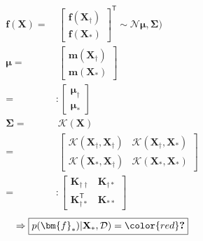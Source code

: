 \begin{align}
    \bm{f}(\mathbf{X})
    =&~ \left[\begin{array}{c}
        \bm{f}(\mathbf{X}_\dagger) \\
        \bm{f}(\mathbf{X}_*)
    \end{array}\right]^\mathsf{T} 
    \sim \mathcal{N}{\bm{\mu},\mathbf{\Sigma})} \\
    \bm{\mu} 
    =&~ \left[\begin{array}{c}
        \bm{m}(\mathbf{X}_\dagger) \\
        \bm{m}(\mathbf{X}_*)
    \end{array}\right] \\
    =&: \left[\begin{array}{c}
        \bm{\mu}_\dagger \\
        \bm{\mu}_*
    \end{array}\right] \\
    \mathbf{\Sigma}
    =&~ \mathcal{K}(\mathbf{X}) \\
    =&~ \left[\begin{array}{cc}
        \mathcal{K}(\mathbf{X}_\dagger,\mathbf{X}_\dagger) & \mathcal{K}(\mathbf{X}_\dagger,\mathbf{X}_*) \\
        \mathcal{K}(\mathbf{X}_*,\mathbf{X}_\dagger) & \mathcal{K}(\mathbf{X}_*,\mathbf{X}_*) 
    \end{array}\right] \\
    =&: \left[\begin{array}{cc}
        \mathbf{K}_{\dagger\dagger} & \mathbf{K}_{\dagger*} \\
        \mathbf{K}_{\dagger*}^\mathsf{T} & \mathbf{K}_{**} 
    \end{array}\right]
\end{align}
\begin{gather}
    \Rightarrow 
    \boxed{p(\bm{f}_*)|\mathbf{X}_*,\mathcal{D}) = {\color{red}\textbf{?}}}
\end{gather}
